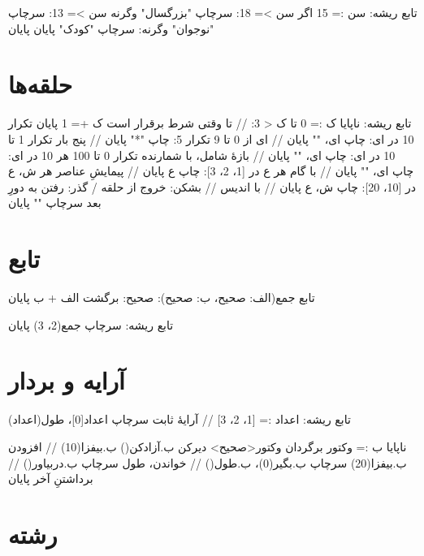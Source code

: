 \begin{salamfa}
تابع ریشه:
    سن := 15
    اگر سن >= 18:
        سرچاپ "بزرگسال"
    وگرنه سن >= 13:
        سرچاپ "نوجوان"
    وگرنه:
        سرچاپ "کودک"
    پایان
پایان
\end{salamfa}

\section{حلقه‌ها}

\begin{salamfa}
تابع ریشه:
    ناپایا ک := 0
    تا ک < 3:                          // تا وقتی شرط برقرار است
        ک += 1
    پایان
    تکرار 10 در ای:  چاپ ای، ""  پایان          // ای از 0 تا 9
    تکرار 5:  چاپ "*"  پایان                    // پنج بار
    تکرار 1 تا 10 در ای:  چاپ ای، ""  پایان     // بازهٔ شامل، با شمارنده
    تکرار 0 تا 100 هر 10 در ای:  چاپ ای، ""  پایان   // با گام
    هر ع در [1، 2، 3]:  چاپ ع  پایان            // پیمایشِ عناصر
    هر ش، ع در [10، 20]:  چاپ ش، ع  پایان     // با اندیس
    // بشکن: خروج از حلقه   /   گذر: رفتن به دورِ بعد
    سرچاپ ""
پایان
\end{salamfa}

\section{تابع}

\begin{salamfa}
تابع جمع(الف: صحیح، ب: صحیح): صحیح:
    برگشت الف + ب
پایان

تابع ریشه:
    سرچاپ جمع(2، 3)
پایان
\end{salamfa}

\section{آرایه و بردار}

\begin{salamfa}
تابع ریشه:
    اعداد := [1، 2، 3]                    // آرایهٔ ثابت
    سرچاپ اعداد[0]، طول(اعداد)

    ناپایا ب := وکتور {} برگردان وکتور<صحیح>
    دیرکن ب.آزادکن()
    ب.بیفزا(10)                           // افزودن
    ب.بیفزا(20)
    سرچاپ ب.بگیر(0)، ب.طول()              // خواندن، طول
    سرچاپ ب.دربیاور()                     // برداشتنِ آخر
پایان
\end{salamfa}

\section{رشته}


